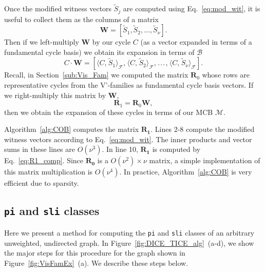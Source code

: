 \documentclass[fleqn,11pt]{article}
\newcommand\calB{\mathcal{B}}
\newcommand\calF{\mathcal{F}}
\newcommand\calM{\mathcal{M}}
\begin{document}
Once the modified witness vectors $\tilde{S}_j$ are computed using Eq.~\eqref{eq:mod_wit}, it is useful to collect them as the columns of a matrix
\begin{equation}
	\bm{W} = [\tilde{S}_1, \tilde{S}_2,\hdots,\tilde{S}_\nu].
\end{equation}
Then if we left-multiply $\bm{W}$ by our cycle $C$ (as a vector expanded in terms of a fundamental cycle basis) we obtain its expansion in terms of $\calB$
\begin{equation}
	C \cdot\bm{W} = [\langle C{,}\hspace{1pt}\tilde{S}_1\rangle_\calF{,}\hspace{1pt}\langle C{,}\hspace{1pt}\tilde{S}_2\rangle_\calF{,}\hspace{1pt}.\hspace{1pt}.\hspace{1pt}.\hspace{1pt}{,}\hspace{1pt}\langle C{,}\hspace{1pt}\tilde{S}_\nu\rangle_\calF].
\end{equation}
Recall, in Section~\ref{sub:Vis_Fam} we computed the matrix $\bm{R}_0$ whose rows are representative cycles from the V'-families as fundamental cycle basis vectors. If we right-multiply this matrix by $\bm{W}$,
\begin{equation}
	\bm{R}_1 = \bm{R}_0 \bm{W},
	\label{eq:R1_comp}
\end{equation}
then we obtain the expansion of these cycles in terms of our MCB $\calM$.


Algorithm~\ref{alg:COB} computes the matrix $\bm{R_1}$. Lines 2-8 compute the modified witness vectors according to Eq.~\eqref{eq:mod_wit}. The inner products and vector sums in these lines are $O(\nu^3)$. In line 10, $\bm{R_1}$ is computed by Eq.~\eqref{eq:R1_comp}. 
Since $\bm{R_0}$ is a $O(\nu^2)\times \nu$ matrix, a simple implementation of this matrix multiplication is $O(\nu^4)$. In practice, Algorithm~\ref{alg:COB} is very efficient due to sparsity.

\subsection{{\tt pi} and {\tt sli} classes}
\label{sub:DICE_TICE_Comp}

Here we present a method for computing the {\tt pi} and {\tt sli} classes of an arbitrary unweighted, undirected graph. 
In Figure~\ref{fig:DICE_TICE_alg}~(a-d), we show the major steps for this procedure for the graph shown in Figure~\ref{fig:VisFamEx}~(a). 
We describe these steps below.
\end{document}
